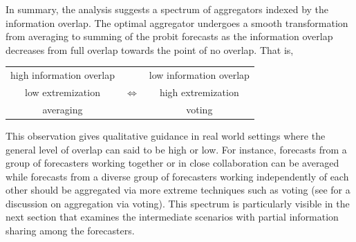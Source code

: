 \documentclass[11pt]{article}
\newtheorem{observation}[theorem]{Observation}
\newtheorem{proposition}[theorem]{Proposition}
\theoremstyle{definition}
\theoremstyle{definition}
\begin{document}
In summary, the analysis suggests a spectrum of aggregators indexed by the 
information overlap.  The optimal 
aggregator undergoes a smooth transformation from 
averaging to summing of the probit forecasts as the information 
overlap decreases from full overlap towards the point of no overlap.
That is,
\begin{center}
\begin{tabular}{ccc}
high information overlap & & low information overlap\\
low extremization & {\Large $\Longleftrightarrow$} & high extremization \\
averaging  & & voting\\
\end{tabular}
\end{center}
This observation gives qualitative
guidance in real world settings where the general level of overlap 
can said to be high or low.  For instance, forecasts from a group 
of forecasters working together or in close collaboration can be 
averaged while forecasts from a diverse group of forecasters working 
independently of each other should be aggregated via more extreme 
techniques such as voting (see \citealt{parunak2013characterizing} 
for a discussion on aggregation via voting). This spectrum is particularly visible in the next section that  examines the intermediate scenarios with partial information sharing among the forecasters.

%
\end{document}
